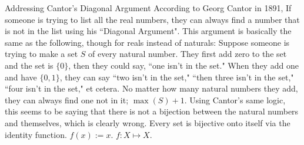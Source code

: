 \documentclass[12pt]{article}
\begin{document}
\begin{section}{Addressing Cantor's Diagonal Argument}\label{sec:diagonal argument}
	According to Georg Cantor in 1891, If someone is trying to list all the real numbers,
	they can always find a number that is not in the list using his ``Diagonal Argument".
	This argument is basically the same as the following, though for reals instead of
	naturals: Suppose someone is trying to make a set $S$ of every natural number. They first
	add zero to the set and the set is $\{0\}$, then they could say, ``one isn't in the set."
	When they add one and have $\{0,1\}$, they can say ``two isn't in the set," ``then three
	isn't in the set," ``four isn't in the set," et cetera. No matter how many natural numbers
	they add, they can always find one not in it; $\max(S)+1$. Using Cantor's same logic, this
	seems to be saying that there is not a bijection between the natural numbers and themselves,
	which is clearly wrong. Every set is bijective onto itself via the identity function.
	$f(x) := x$. $f:X\mapsto X$.
\end{section}
\end{document}
